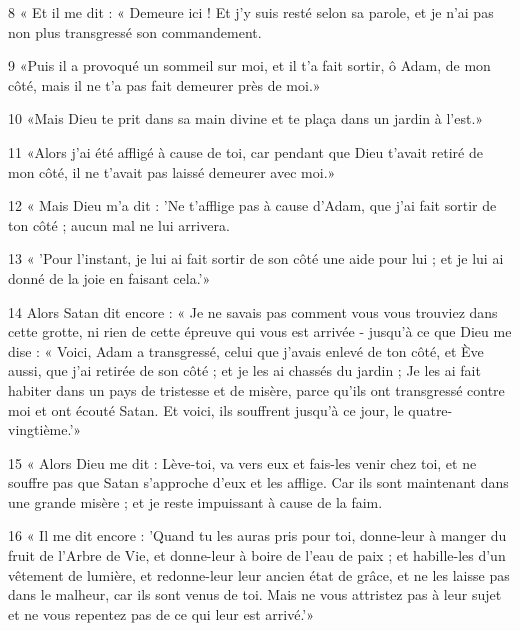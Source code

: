 \par 8 « Et il me dit : « Demeure ici ! Et j’y suis resté selon sa parole, et je n’ai pas non plus transgressé son commandement.

\par 9 «Puis il a provoqué un sommeil sur moi, et il t'a fait sortir, ô Adam, de mon côté, mais il ne t'a pas fait demeurer près de moi.»

\par 10 «Mais Dieu te prit dans sa main divine et te plaça dans un jardin à l'est.»

\par 11 «Alors j'ai été affligé à cause de toi, car pendant que Dieu t'avait retiré de mon côté, il ne t'avait pas laissé demeurer avec moi.»

\par 12 « Mais Dieu m'a dit : 'Ne t'afflige pas à cause d'Adam, que j'ai fait sortir de ton côté ; aucun mal ne lui arrivera.

\par 13 « 'Pour l'instant, je lui ai fait sortir de son côté une aide pour lui ; et je lui ai donné de la joie en faisant cela.'»

\par 14 Alors Satan dit encore : « Je ne savais pas comment vous vous trouviez dans cette grotte, ni rien de cette épreuve qui vous est arrivée - jusqu'à ce que Dieu me dise : « Voici, Adam a transgressé, celui que j'avais enlevé de ton côté, et Ève aussi, que j'ai retirée de son côté ; et je les ai chassés du jardin ; Je les ai fait habiter dans un pays de tristesse et de misère, parce qu'ils ont transgressé contre moi et ont écouté Satan. Et voici, ils souffrent jusqu'à ce jour, le quatre-vingtième.'»

\par 15 « Alors Dieu me dit : Lève-toi, va vers eux et fais-les venir chez toi, et ne souffre pas que Satan s'approche d'eux et les afflige. Car ils sont maintenant dans une grande misère ; et je reste impuissant à cause de la faim.

\par 16 « Il me dit encore : 'Quand tu les auras pris pour toi, donne-leur à manger du fruit de l'Arbre de Vie, et donne-leur à boire de l'eau de paix ; et habille-les d'un vêtement de lumière, et redonne-leur leur ancien état de grâce, et ne les laisse pas dans le malheur, car ils sont venus de toi. Mais ne vous attristez pas à leur sujet et ne vous repentez pas de ce qui leur est arrivé.'»

